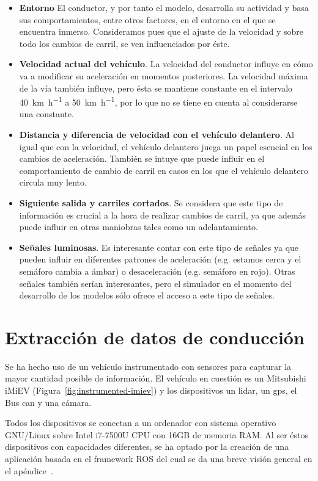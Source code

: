 \begin{itemize}
	\item \textbf{Entorno} El conductor, y por tanto el modelo, desarrolla su actividad y basa sus comportamientos, entre otros factores, en el entorno en el que se encuentra inmerso. Consideramos pues que el ajuste de la velocidad y sobre todo los cambios de carril, se ven influenciados por éste.
	\item \textbf{Velocidad actual del vehículo}. La velocidad del conductor influye en cómo va a modificar su aceleración en momentos posteriores. La velocidad máxima de la vía también influye, pero ésta se mantiene constante en el intervalo \SI{40}{\kilo\meter\per\hour} a \SI{50}{\kilo\meter\per\hour}, por lo que no se tiene en cuenta al considerarse una constante.
	\item \textbf{Distancia y diferencia de velocidad con el vehículo delantero}. Al igual que con la velocidad, el vehículo delantero juega un papel esencial en los cambios de aceleración. También se intuye que puede influir en el comportamiento de cambio de carril en casos en los que el vehículo delantero circula muy lento.
	\item \textbf{Siguiente salida y carriles cortados}. Se considera que este tipo de información es crucial a la hora de realizar cambios de carril, ya que además puede influir en otras maniobras tales como un adelantamiento.
	\item \textbf{Señales luminosas}. Es interesante contar con este tipo de señales ya que pueden influir en diferentes patrones de aceleración (e.g. estamos cerca y el semáforo cambia a ámbar) o desaceleración (e.g. semáforo en rojo). Otras señales también serían interesantes, pero el simulador en el momento del desarrollo de los modelos sólo ofrece el acceso a este tipo de señales.
\end{itemize}

\section{Extracción de datos de conducción}

Se ha hecho uso de un vehículo instrumentado con sensores para capturar la mayor cantidad posible de información. El vehículo en cuestión es un Mitsubishi iMiEV (Figura~\ref{fig:instrumented-imiev}) y los dispositivos un \Acrfull{lidar}, un \Acrfull{gps}, el Bus \Acrfull{can} y una cámara.

Todos los dispositivos se conectan a un ordenador con sistema operativo GNU/Linux sobre Intel i7-7500U CPU con 16GB de memoria RAM. Al ser éstos dispositivos con capacidades diferentes, se ha optado por la creación de una aplicación basada en el framework ROS del cual se da una breve visión general en el apéndice~.

